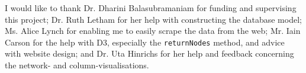 I would like to thank Dr. Dharini Balasubramaniam for funding and supervising
this project; Dr. Ruth Letham for her help with constructing the database model;
Ms. Alice Lynch for enabling me to easily scrape the data from the web; Mr. Iain
Carson for the help with D3, especially the \texttt{returnNodes} method, and
advice with website design; and Dr. Uta Hinrichs for her help and feedback
concerning the network- and column-visualisations.